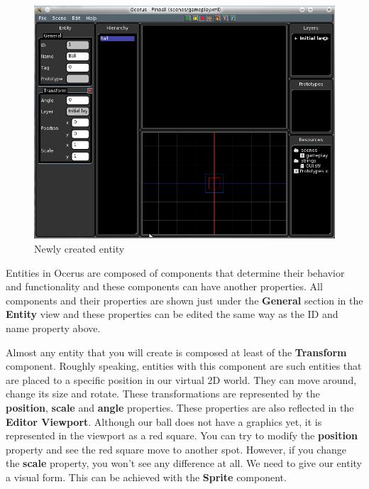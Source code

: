 \documentclass[a4paper,12pt]{article}
\begin{document}
\begin{figure}[ht]
 \begin{center}
  \includegraphics[width=\textwidth]{NewEntityCreated}
 \end{center}
 \caption{Newly created entity}
 \label{fig:new_entity_created}
\end{figure}


Entities in Ocerus are composed of components that determine their behavior and functionality and these components can have another properties. All components and their properties are shown just under the \textbf{General} section in the \textbf{Entity} view and these properties can be edited the same way as the ID and name property above.

Almost any entity that you will create is composed at least of the \textbf{Transform} component. Roughly speaking, entities with this component are such entities that are placed to a specific position in our virtual 2D world. They can move around, change its size and rotate. These transformations are represented by the \textbf{position}, \textbf{scale} and \textbf{angle} properties. These properties are also reflected in the \textbf{Editor Viewport}. Although our ball does not have a graphics yet, it is represented in the viewport as a red square. You can try to modify the \textbf{position} property and see the red square move to another spot. However, if you change the \textbf{scale} property, you won't see any difference at all. We need to give our entity a visual form. This can be achieved with the \textbf{Sprite} component.
\end{document}
